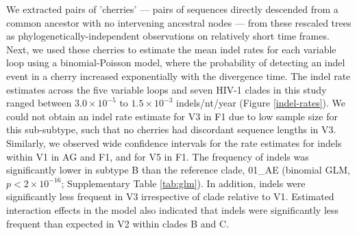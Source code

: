 \documentclass[12pt]{article}
\begin{document}
We extracted pairs of 'cherries' --- pairs of sequences directly descended from a common ancestor with no intervening ancestral nodes --- from these rescaled trees as phylo\-genetically-independent observations on relatively short time frames.
Next, we used these cherries to estimate the mean indel rates for each variable loop using a binomial-Poisson model, where the probability of detecting an indel event in a cherry increased exponentially with the divergence time.
The indel rate estimates across the five variable loops and seven HIV-1 clades in this study ranged between $3.0 \times10^{-5}$ to $1.5\times10^{-3}$ indels/nt/year (Figure \ref{indel-rates}). 
We could not obtain an indel rate estimate for V3 in F1 due to low sample size for this sub-subtype, such that no cherries had discordant sequence lengths in V3.
Similarly, we observed wide confidence intervals for the rate estimates for indels within V1 in AG and F1, and for V5 in F1.  
The frequency of indels was significantly lower in subtype B than the reference clade, 01\_AE (binomial GLM, $p<2\times 10^{-16}$; Supplementary Table \ref{tab:glm}).
In addition, indels were significantly less frequent in V3 irrespective of clade relative to V1.
Estimated interaction effects in the model also indicated that indels were significantly less frequent than expected in V2 within clades B and C.
\end{document}
